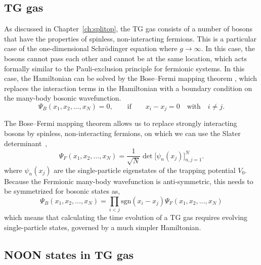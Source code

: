 \subsection{TG gas}

As discussed in Chapter~\ref{ch:splitop}, the TG gas consists of a number of bosons that have the properties of spinless, non-interacting fermions.
This is a particular case of the one-dimensional Schr\"odinger equation where $g\rightarrow\infty$.
In this case, the bosons cannot pass each other and cannot be at the same location, which acts formally similar to the Pauli-exclusion principle for fermionic systems.
In this case, the Hamiltonian can be solved by the Bose--Fermi mapping theorem \cite{girardeau2001ground, girardeau2001measurement}, which replaces the interaction terms in the Hamiltonian with a boundary condition on the many-body bosonic wavefunction.
\begin{equation}
\Psi_B(x_1, x_2, \ldots, x_N) = 0,\qquad \mathrm{if}\qquad x_i - x_j = 0 \quad\textrm{with}\quad i \ne j.
\end{equation}

\noindent The Bose--Fermi mapping theorem allows us to replace strongly interacting bosons by spinless, non-interacting fermions, on which we can use the Slater determinant~\cite{slater1929},
\begin{equation}
\Psi_F (x_1, x_2, \ldots, x_N) = \frac{1}{\sqrt{N}} \det\Big[\psi_n(x_j)\Big]_{n,j=1}^N.
\end{equation}
\noindent where $\psi_n(x_j)$ are the single-particle eigenstates of the trapping potential $V_0$.
Because the Fermionic many-body wavefunction is anti-symmetric, this needs to be symmetrized for bosonic states as, 
\begin{equation}
\Psi_B(x_1, x_2, \ldots, x_N) =
\prod_{i < j}
\mathrm{sgn}(x_i - x_j)\Psi_F(x_1, x_2, \ldots, x_N)
\end{equation}
\noindent which means that calculating the time evolution of a TG gas requires evolving single-particle states, governed by a much simpler Hamiltonian.

\subsection{NOON states in TG gas}
\label{sec:controltro}

